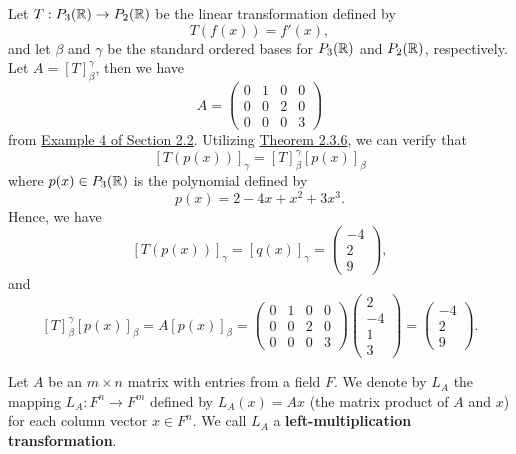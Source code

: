 \begin{eg}
    Let \( T: {P}_{3}(\mathbb{R}) \to {P}_{2}(\mathbb{R}) \) be the linear transformation defined by 
    \[  T(f(x)) = f'(x), \]
    and let \( \beta \) and \( \gamma \) be the standard ordered bases for \( {P}_{3}(\mathbb{R}) \) and \( {P}_{2}(\mathbb{R}) \), respectively. Let \( A = [T]_{\beta}^{\gamma}  \), then we have
    \[ A  = \begin{pmatrix}
        0 & 1 & 0 & 0 \\
        0 & 0 & 2 & 0 \\
        0 & 0 & 0 & 3
    \end{pmatrix} \]
    from {\hyperref[Example 4 of Section 2.2]{Example 4 of Section 2.2}}. Utilizing {\hyperref[Theorem 2.3.6]{Theorem 2.3.6}}, we can verify that  
    \[  [T(p(x))]_{\gamma} = [T]_{\beta}^{\gamma}  [p(x)]_{\beta} \]
    where \( p(x) \in {P}_{3}(\mathbb{R}) \) is the polynomial defined by
     \[  p(x) = 2 - 4x + x^{2} + 3x^{3}. \]
     Hence, we have
     \[ [T(p(x))]_{\gamma} = [q(x)]_{\gamma} = \begin{pmatrix}
         -4 \\
         2 \\
         9
     \end{pmatrix},  \]
     and
     \[ [T]_{\beta}^{\gamma}  [p(x)]_{\beta} = A [p(x)]_{\beta} = \begin{pmatrix}
        0 & 1 & 0 & 0 \\
        0 & 0 & 2 & 0 \\
        0 & 0 & 0 & 3
    \end{pmatrix} \begin{pmatrix}
        2 \\
        -4 \\
        1 \\
        3
    \end{pmatrix} = \begin{pmatrix}
        -4 \\
        2 \\
        9 
    \end{pmatrix}.   \]
\end{eg}

\begin{definition}\label{LMT}
   Let \( A  \) be an \( m \times n  \) matrix with entries from a field \( F  \). We denote by \( {L}_{A} \) the mapping \( {L}_{A} : F^{n} \to F^{m } \) defined by \( {L}_{A} (x) = Ax \) (the matrix product of \( A  \) and \( x \)) for each column vector \( x \in F^{n} \). We call \( {L}_{A} \) a \textbf{left-multiplication transformation}.
\end{definition} 


